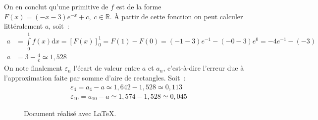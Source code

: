 \documentclass{article}
\begin{document}
    On en conclut qu'une primitive de $f$ est de la forme $F(x) = (-x-3)e^{-x} + c,\;c\in\mathbb{R}$. À partir de cette fonction on peut calculer littéralement $a$, soit~:
    \begin{align*}
     a &= \int\limits_0^1 f(x)\mathrm{d}x = \left[F(x)\right]_0^1 = F(1)-F(0) = (-1-3)e^{-1} - (-0-3)e^0 = -4e^{-1} - (-3) \\
     a &= 3 - \frac{4}{e} \simeq 1,528
    \end{align*}
    On note finalement $\varepsilon_n$ l'écart de valeur entre $a$ et $a_n$, c'est-à-dire l'erreur due à l'approximation faite par somme d'aire de rectangles. Soit~:
    \begin{gather*}
     \varepsilon_4 = a_4-a \simeq 1,642 - 1,528 \simeq 0,113 \\
     \varepsilon_{10} = a_{10}-a \simeq 1,574 - 1,528 \simeq 0,045
    \end{gather*}


    \begin{figure}[b]
     \begin{center}
      Document réalisé avec \LaTeX.
     \end{center}
    \end{figure}
\end{document}
